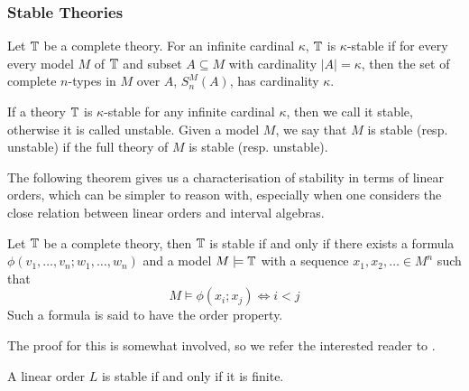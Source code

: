 \subsubsection{Stable Theories}%
\label{ssub:stable_theories}

\begin{defn}
  Let $\mathbb{T}$ be a complete theory. For an infinite cardinal $\kappa$, $\mathbb{T}$ is
  $\kappa$-stable if for every every model $M$ of $\mathbb{T}$ and subset $A \subseteq M$ with 
  cardinality
  $|A| = \kappa$, then the set of complete $n$-types in $M$ over $A$,  $S_n^M(A)$, has cardinality
  $\kappa$.
\end{defn}

If a theory $\mathbb{T}$ is $\kappa$-stable for any infinite cardinal $\kappa$, then we call it stable,
otherwise it is called unstable.
Given a model $M$, we say that $M$ is stable (resp. unstable) if the full theory of $M$
is stable (resp. unstable).

The following theorem gives us a characterisation of stability in terms of linear orders, which can
be simpler to reason with, especially when one considers the close relation between linear orders
and interval algebras.

\begin{thm}\label{thm:stable_order_property}
  Let $\mathbb{T}$ be a complete theory, then $\mathbb{T}$ is stable if and only
  if there exists a formula $\phi(v_1,\dots,v_n;w_1,\dots,w_n)$ and a model $M \models \mathbb{T}$ with
  a sequence $x_1,x_2,\dots \in M^n$ such that
  \begin{equation*}
    M \models \phi(x_i;x_j) \iff i < j
  \end{equation*}
  Such a formula is said to have the order property.
\end{thm}

The proof for this is somewhat involved, so we refer the interested reader to \cite{marker02}.

\begin{cor}
  A linear order $L$ is stable if and only if it is finite.
\end{cor}

